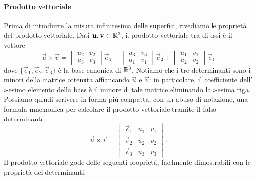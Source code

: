 \paragraph{Prodotto vettoriale}
Prima di introdurre la misura infinitesima delle superfici, rivediamo le proprietà del prodotto vettoriale.
Dati $\mathbf{u},\mathbf{v}\in\mathbb{R}^3$, il prodotto vettoriale tra di essi è il vettore
\begin{equation}
	\vec u\times\vec v=
	\begin{vmatrix}
		u_2& v_2\\u_3&v_3
	\end{vmatrix}\vec e_1+
	\begin{vmatrix}
		u_3&v_3\\u_1&v_1
	\end{vmatrix}\vec e_2+
	\begin{vmatrix}
		u_1&v_1\\u_2&v_2
	\end{vmatrix}\vec e_3
	\label{eq:prodotto-vettoriale}
\end{equation}
dove $\{\vec e_1,\vec e_2,\vec e_3\}$ è la base canonica di $\mathbb{R}^3$.
Notiamo che i tre determinanti sono i minori della matrice ottenuta affiancando $\vec u$ e $\vec v$: in particolare, il coefficiente dell'$i$-esimo elemento della base è il minore di tale matrice eliminando la $i$-esima riga.
Possiamo quindi scrivere in forma più compatta, con un abuso di notazione, una formula mnemonica per calcolare il prodotto vettoriale tramite il falso determinante
\begin{equation*}
	\vec u\times\vec v=
	\begin{vmatrix}
		\vec e_1& u_1& v_1\\
		\vec e_2& u_2& v_2\\
		\vec e_3& u_3& v_3
	\end{vmatrix}.
\end{equation*}
Il prodotto vettoriale gode delle seguenti proprietà, facilmente dimostrabili con le proprietà dei determinanti:

